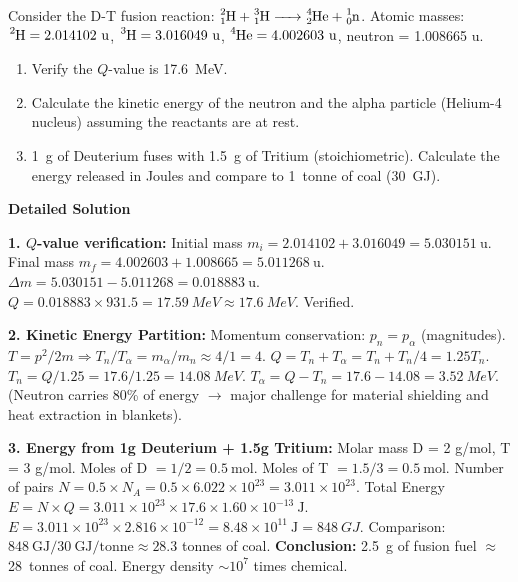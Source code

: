 \documentclass[11pt]{article}
\begin{document}
\begin{exoresolu}
Consider the D-T fusion reaction: $\ce{^{2}_{1}H + ^{3}_{1}H -> ^{4}_{2}He + ^{1}_{0}n}$.
Atomic masses: $\ce{^{2}H} = 2.014102\ \text{u}$, $\ce{^{3}H} = 3.016049\ \text{u}$, $\ce{^{4}He} = 4.002603\ \text{u}$, neutron = 1.008665 u.
\begin{enumerate}
\item Verify the $Q$-value is \SI{17.6}{MeV}.
\item Calculate the kinetic energy of the neutron and the alpha particle (Helium-4 nucleus) assuming the reactants are at rest.
\item \SI{1}{g} of Deuterium fuses with \SI{1.5}{g} of Tritium (stoichiometric). Calculate the energy released in Joules and compare to \SI{1}{tonne} of coal (\SI{30}{GJ}).
\end{enumerate}
\tcblower
\textbf{Detailed Solution}

\textbf{1. $Q$-value verification:}
Initial mass $m_i = 2.014102 + 3.016049 = 5.030151\ \text{u}$.
Final mass $m_f = 4.002603 + 1.008665 = 5.011268\ \text{u}$.
$\Delta m = 5.030151 - 5.011268 = 0.018883\ \text{u}$.
$Q = 0.018883 \times 931.5 = \SI{17.59}{MeV} \approx \SI{17.6}{MeV}$. Verified.

\textbf{2. Kinetic Energy Partition:}
Momentum conservation: $p_n = p_\alpha$ (magnitudes).
$T = p^2 / 2m \Rightarrow T_n / T_\alpha = m_\alpha / m_n \approx 4 / 1 = 4$.
$Q = T_n + T_\alpha = T_n + T_n/4 = 1.25 T_n$.
$T_n = Q / 1.25 = 17.6 / 1.25 = \SI{14.08}{MeV}$.
$T_\alpha = Q - T_n = 17.6 - 14.08 = \SI{3.52}{MeV}$.
(Neutron carries 80\% of energy $\to$ major challenge for material shielding and heat extraction in blankets).

\textbf{3. Energy from 1g Deuterium + 1.5g Tritium:}
Molar mass D = 2 g/mol, T = 3 g/mol.
Moles of D $= 1/2 = 0.5\ \text{mol}$. Moles of T $= 1.5/3 = 0.5\ \text{mol}$.
Number of pairs $N = 0.5 \times N_A = 0.5 \times 6.022 \times 10^{23} = 3.011 \times 10^{23}$.
Total Energy $E = N \times Q = 3.011 \times 10^{23} \times 17.6 \times 1.60 \times 10^{-13}\ \text{J}$.
$E = 3.011 \times 10^{23} \times 2.816 \times 10^{-12} = 8.48 \times 10^{11}\ \text{J} = \SI{848}{GJ}$.
Comparison: $848\ \text{GJ} / 30\ \text{GJ/tonne} \approx 28.3$ tonnes of coal.
\textbf{Conclusion:} \SI{2.5}{g} of fusion fuel $\approx$ \SI{28}{tonnes} of coal. Energy density $\sim 10^7$ times chemical.
\end{exoresolu}
\end{document}
